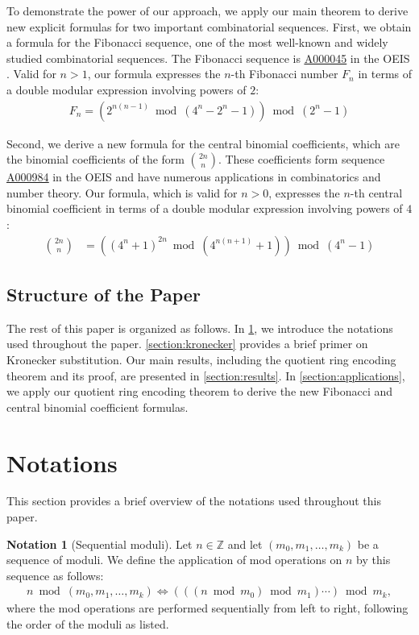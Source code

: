 \documentclass[12pt,reqno]{article}
\theoremstyle{plain}
\theoremstyle{definition}
\newtheorem{notation}{Notation}
\newcommand{\seqnum}[1]{\href{https://oeis.org/#1}{\rm \underline{#1}}}
\begin{document}
To demonstrate the power of our approach, we apply our main theorem to derive new explicit formulas for two important combinatorial sequences. First, we obtain a formula for the Fibonacci sequence, one of the most well-known and widely studied combinatorial sequences. The Fibonacci sequence is \seqnum{A000045} in the OEIS \cite{A000045}. Valid for $n > 1$, our formula expresses the $n$-th Fibonacci number $F_n$ in terms of a double modular expression involving powers of $2$:
\begin{align*}
    F_n = (2^{n(n-1)} \bmod{(4^n-2^n-1)}) \bmod{(2^n-1)}
\end{align*}

Second, we derive a new formula for the central binomial coefficients, which are the binomial coefficients of the form $\binom{2n}{n}$. These coefficients form sequence \seqnum{A000984} in the OEIS \cite{A000984} and have numerous applications in combinatorics and number theory. Our formula, which is valid for $n > 0$, expresses the $n$-th central binomial coefficient in terms of a double modular expression involving powers of $4$:
\begin{align*}
    \binom{2n}{n} &= ((4^n + 1)^{2n} \bmod{(4^{n(n+1)} + 1)}) \bmod{(4^n-1)}
\end{align*}

\subsection{Structure of the Paper}
The rest of this paper is organized as follows. In \cref{section:notations}, we introduce the notations used throughout the paper. \cref{section:kronecker} provides a brief primer on Kronecker substitution. Our main results, including the quotient ring encoding theorem and its proof, are presented in \cref{section:results}. In \cref{section:applications}, we apply our quotient ring encoding theorem to derive the new Fibonacci and central binomial coefficient formulas.

\section{Notations} \label{section:notations}
This section provides a brief overview of the notations used throughout this paper.

\begin{notation}[Sequential moduli]
Let $n \in \mathbb{Z}$ and let $(m_0, m_1, \ldots, m_k)$ be a sequence of moduli. We define the application of mod operations on $n$ by this sequence as follows:
\begin{align*}
    n \bmod{(m_0, m_1, \ldots, m_k)} \Longleftrightarrow  (((n \bmod{m_0}) \bmod{m_1}) \cdots ) \bmod{m_k},
\end{align*}
where the mod operations are performed sequentially from left to right, following the order of the moduli as listed.
\end{notation}
\end{document}

